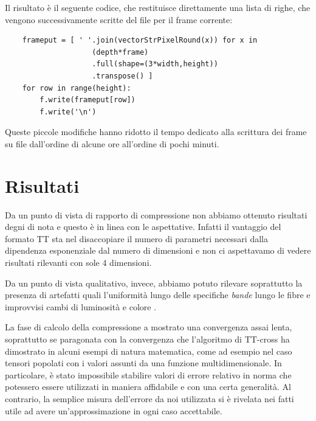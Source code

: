 \documentclass[11pt,a4paper]{article}
\begin{document}
Il risultato è il seguente codice, che restituisce direttamente una lista di righe, che vengono successivamente scritte del file per il frame corrente:
\begin{lstlisting}
    frameput = [ ' '.join(vectorStrPixelRound(x)) for x in 
                    (depth*frame)
                    .full(shape=(3*width,height))
                    .transpose() ]
    for row in range(height):
        f.write(frameput[row])
        f.write('\n')
\end{lstlisting}

Queste piccole modifiche hanno ridotto il tempo dedicato alla scrittura dei frame su file dall'ordine di alcune ore all'ordine di pochi minuti.




\section{Risultati}
Da un punto di vista di rapporto di compressione non abbiamo ottenuto risultati degni di nota e questo è in linea con le aspettative. Infatti il vantaggio del formato TT sta nel disaccopiare il numero di parametri necessari dalla dipendenza esponenziale dal numero di dimensioni e non ci aspettavamo di vedere risultati rilevanti con sole 4 dimensioni.

Da un punto di vista qualitativo, invece, abbiamo potuto rilevare soprattutto la presenza di artefatti quali l'uniformità lungo delle specifiche \emph{bande} lungo le fibre e improvvisi cambi di luminosità e colore .

La fase di calcolo della compressione a mostrato una convergenza assai lenta, soprattutto se paragonata con la convergenza che l'algoritmo di TT-cross ha dimostrato in alcuni esempi di natura matematica, come ad esempio nel caso tensori popolati con i valori assunti da una funzione multidimensionale.  In particolare, è stato impossibile stabilire valori di errore relativo in norma che potessero essere utilizzati in maniera affidabile e con una certa generalità. Al contrario, la semplice misura dell'errore da noi utilizzata si è rivelata nei fatti utile ad avere un'approssimazione in ogni caso accettabile.
\end{document}
